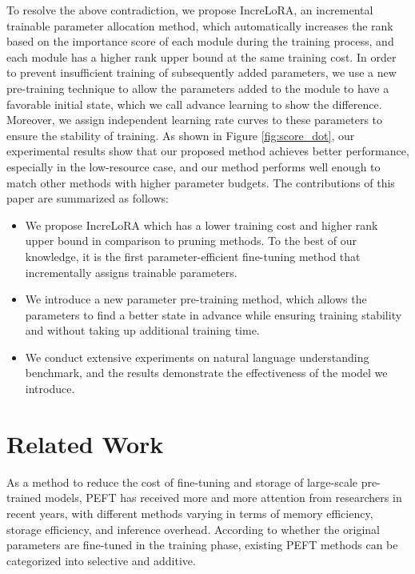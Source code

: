 To resolve the above contradiction, we propose IncreLoRA, an incremental trainable parameter allocation method, which automatically increases the rank based on the importance score of each module during the training process, and each module has a higher rank upper bound at the same training cost. In order to prevent insufficient training of subsequently added parameters, we use a new pre-training technique to allow the parameters added to the module to have a favorable initial state, which we call advance learning to show the difference. Moreover, we assign independent learning rate curves to these parameters to ensure the stability of training. As shown in Figure \ref{fig:score_dot}, our experimental results show that our proposed method achieves better performance, especially in the low-resource case, and our method performs well enough to match other methods with higher parameter budgets. The contributions of this paper are summarized as follows:

\begin{itemize}
\item We propose IncreLoRA which has a lower training cost and higher rank upper bound in comparison to pruning methods. To the best of our knowledge, it is the first parameter-efficient fine-tuning method that incrementally assigns trainable parameters.
\item We introduce a new parameter pre-training method, which allows the parameters to find a better state in advance while ensuring training stability and without taking up additional training time.
\item We conduct extensive experiments on natural language understanding benchmark, and the results demonstrate the effectiveness of the model we introduce.
\end{itemize}

\section{Related Work}

As a method to reduce the cost of fine-tuning and storage of large-scale pre-trained models, PEFT has received more and more attention from researchers in recent years, with different methods varying in terms of memory efficiency, storage efficiency, and inference overhead. According to whether the original parameters are fine-tuned in the training phase, existing PEFT methods can be categorized into selective and additive.


